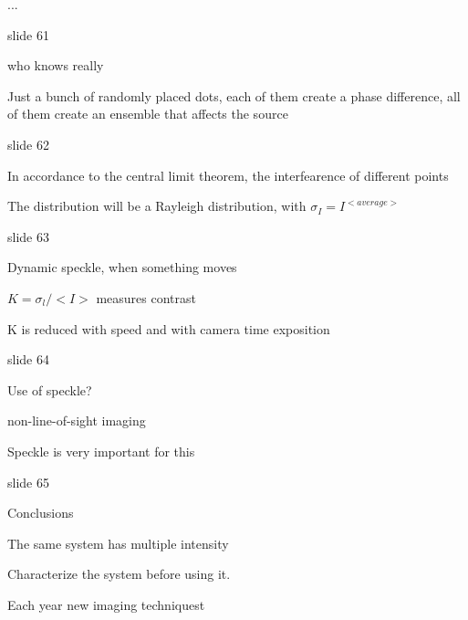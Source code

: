 \documentclass[../main/main.tex]{subfiles}
\begin{document}
...

slide 61

who knows really

Just a bunch of randomly placed dots, each of them create a phase difference, all of them create an ensemble that affects the source

slide 62

In accordance to the central limit theorem, the interfearence of different points

The distribution will be a Rayleigh distribution, with $\sigma_I = I^{<average>}$


slide 63

Dynamic speckle, when something moves

$K = \sigma_l / <I>$ measures contrast

K is reduced with speed and with camera time exposition


slide 64

Use of speckle?

non-line-of-sight imaging

Speckle is very important for this

slide 65

Conclusions

The same system has multiple intensity

Characterize the system before using it.

Each year new imaging techniquest
\end{document}
